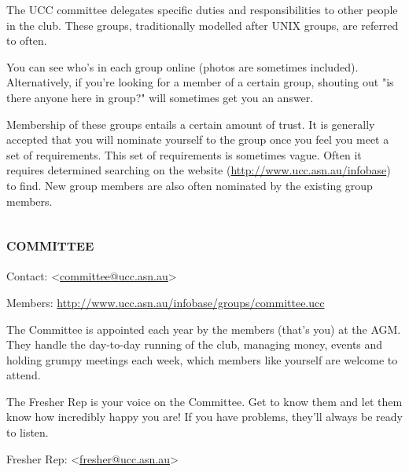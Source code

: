 
\newenvironment{uccgroup}[1]
{
	\begin{mdframed}
	\section{\textsc{#1}}
	\begin{mdframed}
		Contact: <\href{mailto:#1@ucc.asn.au}{#1@ucc.asn.au}>
	\end{mdframed}
	\begin{mdframed}
		Members: \url{http://www.ucc.asn.au/infobase/groups/#1.ucc}
	\end{mdframed}

	

}{\end{mdframed}}

\begin{mdframed}
The UCC committee delegates specific duties and responsibilities to other people in the club. These groups, traditionally modelled after UNIX groups, are referred to often.

You can see who's in each group online (photos are sometimes included). Alternatively, if you're looking for a member of a certain group, shouting out "is there anyone here in group?" will sometimes get you an answer.


Membership of these groups entails a certain amount of trust. It is generally accepted that you will nominate yourself to the group once you feel you meet a set of requirements. This set of requirements is sometimes vague. Often it requires determined searching on the website (\url{http://www.ucc.asn.au/infobase}) to find. New group members are also often nominated by the existing group members.



\end{mdframed}

\begin{uccgroup}{committee}
The Committee is appointed each year by the members (that's you) at the AGM. They handle the day-to-day running of the club, managing money, events and holding grumpy meetings each week, which members like yourself are welcome to attend.


The Fresher Rep is your voice on the Committee. Get to know them and let them know how incredibly happy you are! If you have problems, they'll always be ready to listen.

\begin{mdframed}
Fresher Rep: <\href{mailto:fresher@ucc.asn.au}{fresher@ucc.asn.au}>
\end{mdframed}
\end{uccgroup}

